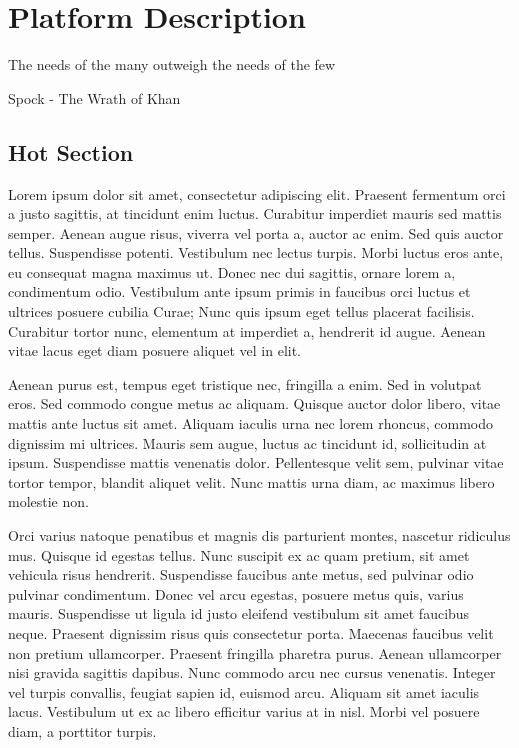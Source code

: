 \chapter{Platform Description}

\begin{FraseCelebre}
\begin{Frase}
The needs of the many outweigh the needs of the few
\end{Frase}
\begin{Fuente}
Spock - The Wrath of Khan
\end{Fuente}
\end{FraseCelebre}

\section{Hot Section}

Lorem ipsum dolor sit amet, consectetur adipiscing elit. Praesent fermentum orci a justo sagittis, at tincidunt enim luctus. Curabitur imperdiet mauris sed mattis semper. Aenean augue risus, viverra vel porta a, auctor ac enim. Sed quis auctor tellus. Suspendisse potenti. Vestibulum nec lectus turpis. Morbi luctus eros ante, eu consequat magna maximus ut. Donec nec dui sagittis, ornare lorem a, condimentum odio. Vestibulum ante ipsum primis in faucibus orci luctus et ultrices posuere cubilia Curae; Nunc quis ipsum eget tellus placerat facilisis. Curabitur tortor nunc, elementum at imperdiet a, hendrerit id augue. Aenean vitae lacus eget diam posuere aliquet vel in elit.

Aenean purus est, tempus eget tristique nec, fringilla a enim. Sed in volutpat eros. Sed commodo congue metus ac aliquam. Quisque auctor dolor libero, vitae mattis ante luctus sit amet. Aliquam iaculis urna nec lorem rhoncus, commodo dignissim mi ultrices. Mauris sem augue, luctus ac tincidunt id, sollicitudin at ipsum. Suspendisse mattis venenatis dolor. Pellentesque velit sem, pulvinar vitae tortor tempor, blandit aliquet velit. Nunc mattis urna diam, ac maximus libero molestie non.

Orci varius natoque penatibus et magnis dis parturient montes, nascetur ridiculus mus. Quisque id egestas tellus. Nunc suscipit ex ac quam pretium, sit amet vehicula risus hendrerit. Suspendisse faucibus ante metus, sed pulvinar odio pulvinar condimentum. Donec vel arcu egestas, posuere metus quis, varius mauris. Suspendisse ut ligula id justo eleifend vestibulum sit amet faucibus neque. Praesent dignissim risus quis consectetur porta. Maecenas faucibus velit non pretium ullamcorper. Praesent fringilla pharetra purus. Aenean ullamcorper nisi gravida sagittis dapibus. Nunc commodo arcu nec cursus venenatis. Integer vel turpis convallis, feugiat sapien id, euismod arcu. Aliquam sit amet iaculis lacus. Vestibulum ut ex ac libero efficitur varius at in nisl. Morbi vel posuere diam, a porttitor turpis.

